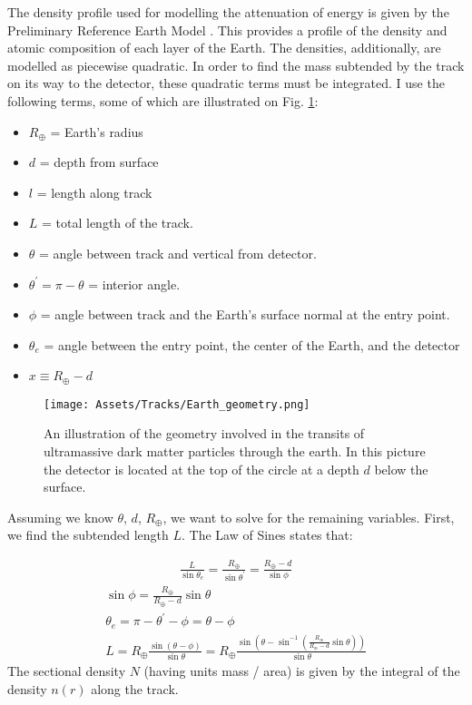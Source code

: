 The density profile used for modelling the attenuation of energy is given by the Preliminary Reference Earth Model \cite{dziewonski_preliminary_1981}.
This provides a profile of the density and atomic composition of each layer of the Earth.
The densities, additionally, are modelled as piecewise quadratic.
In order to find the mass subtended by the track on its way to the detector, these quadratic terms must be integrated.
I use the following terms, some of which are illustrated on Fig. \ref{fig:earth_geometry}:

\begin{itemize}
    \item $R_\oplus $ = Earth's radius
    \item $d$ = depth from surface
    \item $l$ = length along track
    \item $L$ = total length of the track.
    \item $\theta$ = angle between track and vertical from detector.
    \item $\theta ^\prime = \pi - \theta $ = interior angle.
    \item $\phi$ = angle between track and the Earth's surface normal at the entry point.
    \item $\theta_e$ = angle between the entry point, the center of the Earth, and the detector
    \item  $x \equiv R_\oplus - d $
\end{itemize}

\begin{figure}
    \centering
    \texttt{[image: Assets/Tracks/Earth\_geometry.png]}
    \caption[An illustration of the geometry involved in the transits of ultramassive dark matter particles through the earth.]%
    {An illustration of the geometry involved in the transits of ultramassive dark matter particles through the earth.
    In this picture the detector is located at the top of the circle at a depth $d$ below the surface.}
    \label{fig:earth_geometry}
\end{figure}

Assuming we know $\theta$, $d$, $R_\oplus$, we want to solve for the remaining variables.
First, we find the  subtended length $L$.
The Law of Sines states that: 

\begin{align}
\frac{L}{\sin \theta_e} = \frac{R_\oplus}{\sin \theta^\prime} = \frac{R_\oplus - d}{\sin \phi}
\end{align}
\begin{align}
\sin \phi = \frac{R_\oplus}{R_\oplus - d}\sin \theta \\ 
\theta_e = \pi - \theta^\prime - \phi = \theta - \phi \\
L = R_\oplus \frac{\sin (\theta - \phi)} {\sin \theta}
= R_\oplus \frac{\sin (\theta - \sin^{-1}(\frac{R_\oplus}{R_\oplus - d}\sin \theta) )} {\sin \theta}
\end{align}
The sectional density $N$ (having units mass / area) is given by the integral of the density $n(r)$ along the track.

